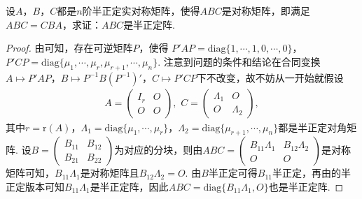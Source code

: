 \documentclass[../../main.tex]{subfiles}
\begin{document}
\begin{proposition}\label{proposition:两个半正定阵可同时合同对角化4}
设\(A\)，\(B\)，\(C\)都是\(n\)阶半正定实对称矩阵，使得\(ABC\)是对称矩阵，即满足\(ABC = CBA\)，求证：\(ABC\)是半正定阵.
\end{proposition}
\begin{proof}
由可知，存在可逆矩阵\(P\)，使得
\(P'AP = \mathrm{diag}\{1,\cdots,1,0,\cdots,0\}\)，\(P'CP = \mathrm{diag}\{\mu_1,\cdots,\mu_r,\mu_{r + 1},\cdots,\mu_n\}\).
注意到问题的条件和结论在合同变换\(A\mapsto P'AP\)，\(B\mapsto P^{-1}B(P^{-1})'\)，\(C\mapsto P'CP\)下不改变，故不妨从一开始就假设
\begin{align*}
A=\begin{pmatrix}I_r&O\\O&O\end{pmatrix},\,\,C=\begin{pmatrix}\Lambda_1&O\\O&\Lambda_2\end{pmatrix},
\end{align*}
其中\(r = \mathrm{r}(A)\)，\(\Lambda_1 = \mathrm{diag}\{\mu_1,\cdots,\mu_r\}\)，\(\Lambda_2 = \mathrm{diag}\{\mu_{r + 1},\cdots,\mu_n\}\)都是半正定对角矩阵. 设\(B=\begin{pmatrix}B_{11}&B_{12}\\B_{21}&B_{22}\end{pmatrix}\)为对应的分块，则由\(ABC=\begin{pmatrix}B_{11}\Lambda_1&B_{12}\Lambda_2\\O&O\end{pmatrix}\)是对称矩阵可知，\(B_{11}\Lambda_1\)是对称矩阵且\(B_{12}\Lambda_2 = O\). 由\(B\)半正定可得\(B_{11}\)半正定，再由的半正定版本可知\(B_{11}\Lambda_1\)是半正定阵，因此\(ABC = \mathrm{diag}\{B_{11}\Lambda_1,O\}\)也是半正定阵. 

\end{proof}
\end{document}

